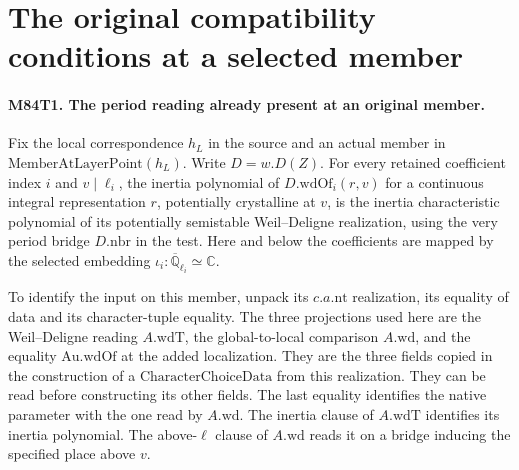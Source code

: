 \section{The original compatibility conditions at a selected member}

\paragraph{M84T1. The period reading already present at an original member.}
Fix the local correspondence $h_L$ in the source and an actual
member in $\mathrm{MemberAtLayerPoint}(h_L)$. Write $D=w.D(Z)$.
For every retained coefficient index $i$ and $v\mid\ell_i$,
the inertia polynomial of $D.\mathrm{wdOf}_i(r,v)$ for a continuous
integral representation $r$, potentially crystalline at $v$, is the
inertia characteristic polynomial of its potentially semistable
Weil--Deligne realization, using the very period bridge $D.\mathrm{nbr}$
in the test. Here and below the coefficients are mapped by the selected
embedding $\iota_i:\overline{\mathbb Q}_{\ell_i}\simeq\mathbb C$.

To identify the input on this member, unpack its $c.a.\mathrm{nt}$
realization, its equality of data and its character-tuple equality.
The three projections used here are the Weil--Deligne reading
$A.\mathrm{wdT}$, the global-to-local comparison $A.\mathrm{wd}$,
and the equality $\mathrm{Au}.\mathrm{wdOf}$ at the added localization.
They are the three fields copied in the construction of a
$\mathrm{CharacterChoiceData}$ from this realization. They can be
read before constructing its other fields. The last equality identifies
the native parameter with the one read by $A.\mathrm{wd}$.
The inertia clause of $A.\mathrm{wdT}$ identifies its inertia
polynomial. The above-$\ell$ clause of $A.\mathrm{wd}$ reads it
on a bridge inducing the specified place above $v$.

